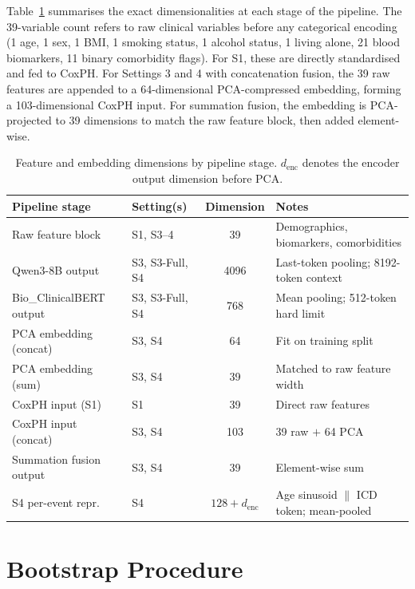 \documentclass[runningheads]{llncs}
\begin{document}
Table~\ref{tab:supp_dims} summarises the exact dimensionalities at each stage
of the pipeline.
The 39-variable count refers to raw clinical variables before any categorical
encoding (1 age, 1 sex, 1 BMI, 1 smoking status, 1 alcohol status, 1 living
alone, 21 blood biomarkers, 11 binary comorbidity flags).
For S1, these are directly standardised and fed to CoxPH.
For Settings 3 and 4 with concatenation fusion, the 39 raw features are
appended to a 64-dimensional PCA-compressed embedding, forming a 103-dimensional
CoxPH input.
For summation fusion, the embedding is PCA-projected to 39 dimensions to match
the raw feature block, then added element-wise.

\begin{table}[H]
\centering
\caption{Feature and embedding dimensions by pipeline stage.
         $d_\text{enc}$ denotes the encoder output dimension before PCA.}
\label{tab:supp_dims}
\begin{tabular}{llcl}
\toprule
Pipeline stage & Setting(s) & Dimension & Notes \\
\midrule
Raw feature block   & S1, S3--4        & 39   & Demographics, biomarkers, comorbidities \\
Qwen3-8B output     & S3, S3-Full, S4  & 4096 & Last-token pooling; 8192-token context \\
Bio\_ClinicalBERT output & S3, S3-Full, S4 & 768 & Mean pooling; 512-token hard limit \\
PCA embedding (concat) & S3, S4         & 64   & Fit on training split \\
PCA embedding (sum)  & S3, S4           & 39   & Matched to raw feature width \\
CoxPH input (S1)    & S1               & 39   & Direct raw features \\
CoxPH input (concat) & S3, S4          & 103  & 39 raw $+$ 64 PCA \\
Summation fusion output & S3, S4        & 39   & Element-wise sum \\
S4 per-event repr.  & S4               & $128 + d_\text{enc}$ & Age sinusoid $\|$ ICD token; mean-pooled \\
\bottomrule
\end{tabular}
\end{table}

\section{Bootstrap Procedure}
\label{supp:bootstrap}
\end{document}
